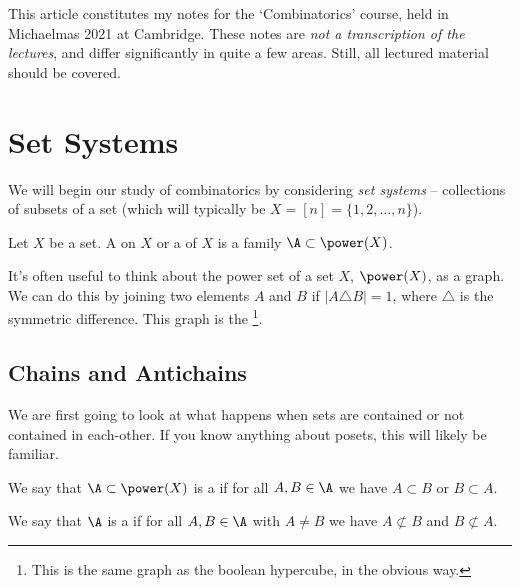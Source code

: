 




This article constitutes my notes for the `Combinatorics' course, held in Michaelmas 2021 at Cambridge. These notes are \emph{not a transcription of the lectures}, and differ significantly in quite a few areas. Still, all lectured material should be covered.







\section{Set Systems}
 
We will begin our study of combinatorics by considering \emph{set systems} -- collections of subsets of a set (which will typically be $X = [n] = \{1, 2, \dots, n\}$).

\begin{definition}
Let $X$ be a set. A  on $X$ or a  of $X$ is a family $\A \subset \power(X)$.
\end{definition}

It's often useful to think about the power set of a set $X$, $\power(X)$, as a graph. We can do this by joining two elements $A$ and $B$ if $|A \triangle B| = 1$, where $\triangle$ is the symmetric difference.
This graph is the \footnote{This is the same graph as the boolean hypercube, in the obvious way.}.


\subsection{Chains and Antichains}

We are first going to look at what happens when sets are contained or not contained in each-other. If you know anything about posets, this will likely be familiar. 

\begin{definition}
We say that $\A \subset \power(X)$ is a  if for all $A, B \in \A$ we have $A \subset B$ or $B \subset A$.

We say that $\A$ is a  if for all $A, B \in \A$ with $A \neq B$ we have $A \not \subset B$ and $B \not \subset A$.
\end{definition}

